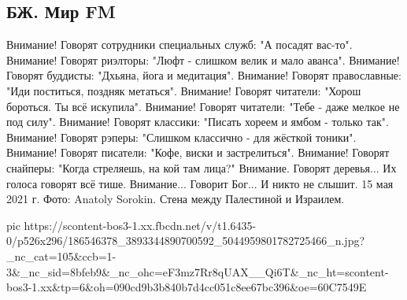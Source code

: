  
 
 
 
 
\subsection{БЖ. Мир FM}

Внимание! 
Говорят сотрудники специальных служб: "А посадят вас-то".
Внимание! 
Говорят риэлторы: "Люфт - слишком велик и мало аванса".
Внимание! 
Говорят буддисты: "Дхьяна, йога и медитация".
Внимание!
Говорят православные: "Иди поститься, поздняк метаться".
Внимание! 
Говорят читатели: "Хорош бороться. Ты всё искупила".
Внимание! 
Говорят читатели: "Тебе - даже мелкое не под силу".
Внимание! 
Говорят классики: "Писать хореем и ямбом - только так".
Внимание! 
Говорят рэперы: "Слишком классично - для жёсткой тоники".
Внимание! 
Говорят писатели: "Кофе, виски и застрелиться".
Внимание! 
Говорят снайперы: "Когда стреляешь,  на кой там лица?"
Внимание. 
Говорят деревья...
Их голоса говорят всё тише.
Внимание...
Говорит Бог...
И никто не слышит.
15 мая 2021 г.
Фото: Anatoly Sorokin. Стена между Палестиной и Израилем.


\ifcmt
  pic https://scontent-bos3-1.xx.fbcdn.net/v/t1.6435-0/p526x296/186546378_3893344890700592_5044959801782725466_n.jpg?_nc_cat=105&ccb=1-3&_nc_sid=8bfeb9&_nc_ohc=eF3mz7Rr8qUAX__Qi6T&_nc_ht=scontent-bos3-1.xx&tp=6&oh=090cd9b3b840b7d4cc051c8ee67bc396&oe=60C7549E
\fi

